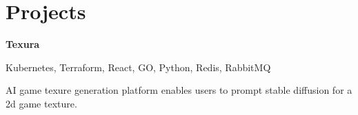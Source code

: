 
\newenvironment{twocolentry_proj}[2][]{
    \onecolentry
    \def\secondColumn{#2}
    \setcolumnwidth{\fill, 7 cm}
    \begin{paracol}{2}
}{
    \switchcolumn \raggedleft \secondColumn
    \end{paracol}
    \endonecolentry
} %

\vspace{5 pt - 0.5 cm}
\section{Projects}
\begin{twocolentry_proj}{
    \mbox{}
}
\fontsize{11 pt}{11 pt}\textbf{Texura}
\end{twocolentry_proj}

\begin{onecolentry}
    Kubernetes, Terraform, React, GO, Python, Redis, RabbitMQ
    \begin{highlights}
        \item AI game texure generation platform enables users to prompt stable diffusion for a 2d game texture.
    \end{highlights}
\end{onecolentry}

